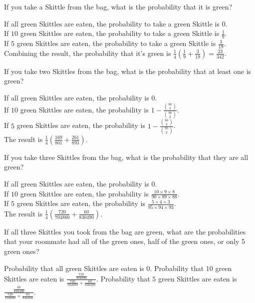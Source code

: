\documentclass[11pt]{article}
\begin{document}
\begin{Parts}
    
    \Part If you take a Skittle from the bag, what is the probability that it is green?
    \begin{Answer}
        If all green Skittles are eaten, the probability to take a green Skittle is $0$. \\
        If $10$ green Skittles are eaten, the probability to take a green Skittle is $\frac{1}{9}$. \\
        If $5$ green Skittles are eaten, the probability to take a green Skittle is $\frac{3}{19}$. \\
        Combining the result, the probability that it's green is $\frac{1}{4}(\frac{1}{9} + \frac{3}{19}) = \frac{23}{342}$. 
    \end{Answer}

    \Part If you take two Skittles from the bag, what is the probability that at least one is green?
    \begin{Answer}
        If all green Skittles are eaten, the probability is $0$. \\
        If $10$ green Skittles are eaten, the probability is $1 - \frac{{80 \choose 2}}{{90 \choose 2}} $. \\
        If $5$ green Skittles are eaten, the probability is $1 - \frac{{80 \choose 2}}{{95 \choose 2}}$. \\
        The result is $\frac{1}{4}(\frac{169}{801} + \frac{261}{893})$. 
    \end{Answer}

    \Part If you take three Skittles from the bag, what is the probability that they are all green?
    \begin{Answer}
        If all green Skittles are eaten, the probability is $0$. \\
        If $10$ green Skittles are eaten, the probability is $\frac{10 \times 9 \times 8}{90 \times 89 \times 88}$. \\
        If $5$ green Skittles are eaten, the probability is $\frac{5 \times 4 \times 3}{95 \times 94 \times 93}$. \\
        The result is $\frac{1}{4}(\frac{720}{704880} + \frac{60}{830490})$. 
    \end{Answer}

    \Part If all three Skittles you took from the bag are green, what are the probabilities that your roommate had all 
          of the green ones, half of the green ones, or only 5 green ones?
    \begin{Answer}
        Probability that all green Skittles are eaten is $0$. 
        Probability that $10$ green Skittles are eaten is $\frac{\frac{720}{704880}}{\frac{720}{704880} + \frac{60}{830490}}$.
        Probability that $5$ green Skittles are eaten is $\frac{\frac{60}{830490}}{\frac{720}{704880} + \frac{60}{830490}}$.
    \end{Answer}


\end{Parts}
\end{document}
